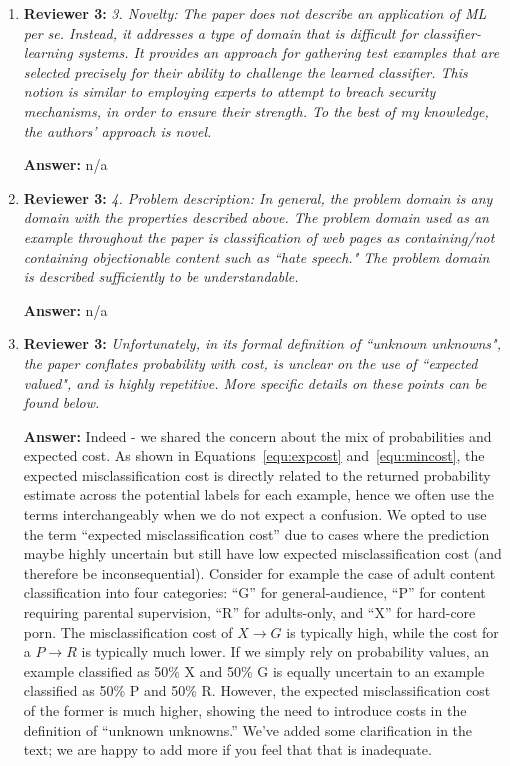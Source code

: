 \documentclass[letterpaper]{article}
\begin{document}
\begin{enumerate}
\item \textbf{Reviewer 3:} \emph{ 3. Novelty: The paper does not describe an application of ML per se.  Instead, it addresses a type of domain that is difficult for classifier-learning systems.  It provides an approach for gathering test examples that are selected precisely for their ability to challenge the learned classifier.  This notion is similar to employing experts to attempt to breach security mechanisms, in order to ensure their strength.  To the best of my knowledge, the authors' approach is novel.}

\textbf{Answer:} n/a

\item \textbf{Reviewer 3:} \emph{ 4. Problem description: In general, the problem domain is any domain with the properties described above.  The problem domain used as an example throughout the paper is classification of web pages as containing/not containing objectionable content such as ``hate speech."  The problem domain is described sufficiently to be understandable.}

\textbf{Answer:} n/a

\item \label{whycost} \textbf{Reviewer 3:} \emph{ Unfortunately, in its formal definition of ``unknown unknowns", the paper conflates probability with cost, is unclear on the use of ``expected valued", and is highly repetitive.  More specific details on these points can be found below.}

\textbf{Answer:} Indeed - we shared the concern about the mix of probabilities and expected cost. As shown in Equations~\ref{equ:expcost} and~\ref{equ:mincost}, the expected misclassification cost is directly related to the returned probability estimate across the potential labels for each example, hence we often use the terms interchangeably when we do not expect a confusion. We opted to use the term ``expected misclassification cost'' due to cases where the prediction maybe highly uncertain but still have low expected misclassification cost (and therefore be inconsequential). Consider for example the case of adult content classification into four categories: ``G'' for general-audience, ``P'' for content requiring parental supervision, ``R'' for adults-only, and ``X'' for hard-core porn. The misclassification cost of $X \rightarrow G$ is typically high, while the cost for a $P \rightarrow R$ is typically much lower. If we simply rely on probability values, an example classified as 50\% X and 50\% G is equally uncertain to an example classified as 50\% P and 50\% R. However, the expected misclassification cost of the former is much higher, showing the need to introduce costs in the definition of ``unknown unknowns.''  We've added some clarification in the text; we are happy to add more if you feel that that is inadequate.


\end{enumerate}
\end{document}
